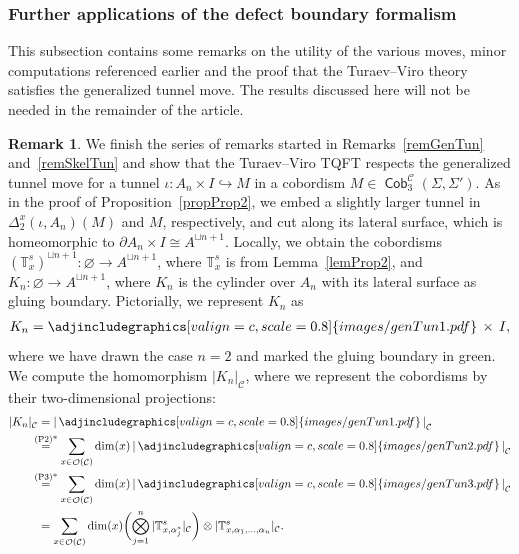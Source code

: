 \documentclass[10pt,a4paper]{amsart}
\DeclareMathOperator{\Cob}{\mathsf{Cob}}
\DeclareMathOperator{\calc}{\mathcal{C}}
\DeclareMathOperator{\calo}{\mathcal{O}}
\numberwithin{equation}{section}
\theoremstyle{definition}
\newtheorem{Remark}[Remark]{Remark}
\begin{document}
\subsubsection{Further applications of the defect boundary formalism}
\label{subSecApp}
This subsection contains some remarks on the utility of the various moves, minor computations referenced earlier and the proof that the Turaev--Viro theory satisfies the generalized tunnel move. The results discussed here will not be needed in the remainder of the article.
\begin{Remark}
 We finish the series of remarks started in Remarks~\ref{remGenTun} and~\ref{remSkelTun} and show that the Turaev--Viro TQFT respects the generalized tunnel move for a tunnel $\iota\colon A_n \times I \hookrightarrow M$ in a cobordism $M \in \Cob_3^{\calc}(\Sigma, \Sigma')$. As in the proof of Proposition~\ref{propProp2}, we embed a slightly larger tunnel in $\Delta_2^{x}(\iota, A_n)(M)$ and $M$, respectively, and cut along its lateral surface, which is homeomorphic to $\partial A_n \times I \cong A^{\sqcup n +1}$. Locally, we obtain the cobordisms $(\mathbb{T}_x^s)^{\sqcup n +1}\colon \varnothing \rightarrow A^{\sqcup n+1}$, where $\mathbb{T}_x^s$ is from Lemma~\ref{lemProp2}, and $K_n\colon \varnothing \rightarrow A^{\sqcup n+1}$, where $K_n$ is the cylinder over $A_n$ with its lateral surface as gluing boundary. Pictorially, we represent $K_n$ as
 \begin{align*}
 K_n = \adjincludegraphics[valign=c, scale = 0.8]{images/genTun1.pdf} \, \times \, I,
 \end{align*}
 where we have drawn the case $n = 2$ and marked the gluing boundary in green. We compute the homomorphism $|K_n|_{\calc}$, where we represent the cobordisms by their two-dimensional projections:
 \begin{align*}
 |K_n|_{\calc} & = \left| \, \adjincludegraphics[valign=c, scale = 0.8]{images/genTun1.pdf} \, \right|_{\calc} \\
 &\hspace{-2mm}\overset{\text{(P2)*}}{=} \sum_{x \in \calo(\calc)} \dim(x) \left| \, \adjincludegraphics[valign=c, scale = 0.8]{images/genTun2.pdf} \, \right|_{\calc} \\
 &\hspace{-2mm}\overset{\text{(P3)*}}{=} \sum_{x \in \calo(\calc)}   \dim(x) \left| \, \adjincludegraphics[valign=c, scale = 0.8]{images/genTun3.pdf} \, \right|_{\calc} \\
 & = \sum_{x \in \calo(\calc)}   \dim(x) \biggl(\bigotimes_{j = 1}^n |\mathbb{T}_{x, \alpha_j^*}^s|_{\calc}\biggr) \otimes |\mathbb{T}_{x, \alpha_1, \dots, \alpha_n}^s|_{\calc}.

\end{align*}
\end{Remark}
\end{document}
